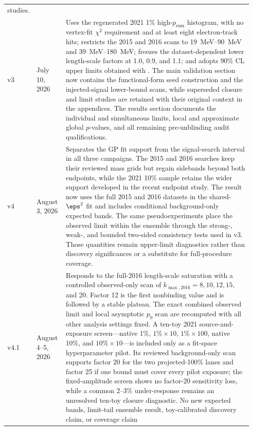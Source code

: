 \begin{longtable}{P{0.11\textwidth}P{0.16\textwidth}P{0.64\textwidth}}
studies. \\
\addlinespace
v3 & July 10, 2026 &
Uses the regenerated 2021 1\% high-$p_{\mathrm{sum}}$ histogram, with no vertex-fit
$\chi^2$ requirement and at least eight electron-track hits; restricts the 2015 and
2016 scans to \SIrange{19}{90}{MeV} and \SIrange{39}{180}{MeV}; freezes the
dataset-dependent lower length-scale factors at 1.0, 0.9, and 1.1; and adopts 90\% CL
upper limits obtained with \CLs{}. The main validation section now contains the
functional-form seed construction and the injected-signal lower-bound scans, while
superseded closure and limit studies are retained with their original context in the
appendices. The results section documents the individual and simultaneous limits,
local and approximate global $p$-values, and all remaining pre-unblinding audit
qualifications. \\
\addlinespace
v4 & August 3, 2026 &
Separates the GP fit support from the signal-search interval in all three campaigns.
The 2015 and 2016 searches keep their reviewed mass grids but regain sidebands beyond
both endpoints, while the 2021 10\% sample retains the wider support developed in the
recent endpoint study. The result now uses the full 2015 and 2016 datasets in the
shared-$\eps^2$ fit and includes conditional background-only expected bands. The same
pseudoexperiments place the observed limit within the ensemble through the strong-,
weak-, and bounded two-sided consistency tests used in v3. Those quantities remain
upper-limit diagnostics rather than discovery significances or a substitute for
full-procedure coverage. \\
\addlinespace
v4.1 & August 4--5, 2026 &
Responds to the full-2016 length-scale saturation with a controlled observed-only
scan of $k_{\max,2016}=8,10,12,15,$ and 20. Factor 12 is the first nonbinding value
and is followed by a stable plateau. The exact combined observed limit and local
asymptotic $p_0$ scan are recomputed with all other analysis settings fixed. A
ten-toy 2021 source-and-exposure screen---native 1\%, $1\%\times10$,
$1\%\times100$, native 10\%, and $10\%\times10$---is included only as a fit-space
hyperparameter pilot. Its reviewed background-only scan supports factor 20 for the two
projected-100\% lanes and factor 25 if one bound must cover every pilot exposure;
the fixed-amplitude screen shows no factor-20 sensitivity loss, while a common 2--3\%
under-response remains an unresolved ten-toy closure diagnostic. No new expected
bands, limit-tail ensemble result, toy-calibrated discovery claim, or coverage claim

\end{longtable}
